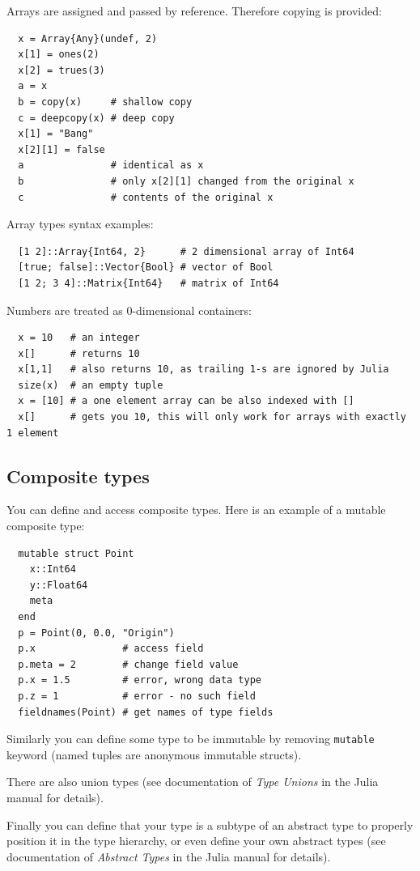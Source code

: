 \documentclass[10pt,a4paper]{article}
\begin{document}
Arrays are assigned and passed by reference. Therefore copying is provided:
\begin{lstlisting}
  x = Array{Any}(undef, 2)
  x[1] = ones(2)
  x[2] = trues(3)
  a = x
  b = copy(x)     # shallow copy
  c = deepcopy(x) # deep copy
  x[1] = "Bang"
  x[2][1] = false
  a               # identical as x
  b               # only x[2][1] changed from the original x
  c               # contents of the original x
\end{lstlisting}

Array types syntax examples:
\begin{lstlisting}
  [1 2]::Array{Int64, 2}      # 2 dimensional array of Int64
  [true; false]::Vector{Bool} # vector of Bool
  [1 2; 3 4]::Matrix{Int64}   # matrix of Int64
\end{lstlisting}

Numbers are treated as 0-dimensional containers:
\begin{lstlisting}
  x = 10   # an integer
  x[]      # returns 10
  x[1,1]   # also returns 10, as trailing 1-s are ignored by Julia
  size(x)  # an empty tuple
  x = [10] # a one element array can be also indexed with []
  x[]      # gets you 10, this will only work for arrays with exactly 1 element
\end{lstlisting}

\subsection{Composite types}
You can define and access composite types. Here is an example of a mutable composite type:
\begin{lstlisting}
  mutable struct Point
    x::Int64
    y::Float64
    meta
  end
  p = Point(0, 0.0, "Origin")
  p.x               # access field
  p.meta = 2        # change field value
  p.x = 1.5         # error, wrong data type
  p.z = 1           # error - no such field
  fieldnames(Point) # get names of type fields
\end{lstlisting}

Similarly you can define some type to be immutable by removing
\lstinline|mutable| keyword (named tuples are anonymous immutable structs).

There are also union types (see documentation of \emph{Type Unions} in the Julia
manual for details).

Finally you can define that your type is a subtype of an abstract type to
properly position it in the type hierarchy, or even define your own abstract
types (see documentation of \emph{Abstract Types} in the Julia manual for
details).
\end{document}
